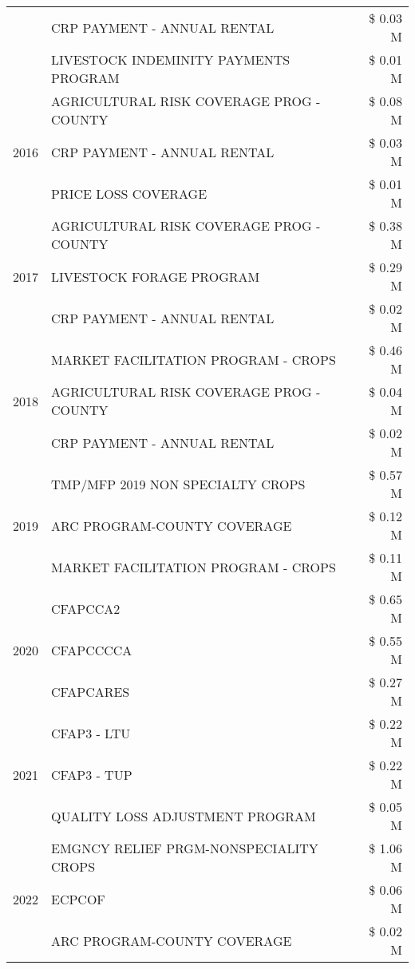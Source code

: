 \begin{tabular}{llr}
 & CRP PAYMENT - ANNUAL RENTAL & \$ 0.03 M \\
 & LIVESTOCK INDEMINITY PAYMENTS PROGRAM & \$ 0.01 M \\
\cline{1-3}
\multirow[t]{3}{*}{2016} & AGRICULTURAL RISK COVERAGE PROG - COUNTY & \$ 0.08 M \\
 & CRP PAYMENT - ANNUAL RENTAL & \$ 0.03 M \\
 & PRICE LOSS COVERAGE & \$ 0.01 M \\
\cline{1-3}
\multirow[t]{3}{*}{2017} & AGRICULTURAL RISK COVERAGE PROG - COUNTY & \$ 0.38 M \\
 & LIVESTOCK FORAGE PROGRAM & \$ 0.29 M \\
 & CRP PAYMENT - ANNUAL RENTAL & \$ 0.02 M \\
\cline{1-3}
\multirow[t]{3}{*}{2018} & MARKET FACILITATION PROGRAM - CROPS & \$ 0.46 M \\
 & AGRICULTURAL RISK COVERAGE PROG - COUNTY & \$ 0.04 M \\
 & CRP PAYMENT - ANNUAL RENTAL & \$ 0.02 M \\
\cline{1-3}
\multirow[t]{3}{*}{2019} & TMP/MFP 2019 NON SPECIALTY CROPS & \$ 0.57 M \\
 & ARC PROGRAM-COUNTY COVERAGE & \$ 0.12 M \\
 & MARKET FACILITATION PROGRAM - CROPS & \$ 0.11 M \\
\cline{1-3}
\multirow[t]{3}{*}{2020} & CFAPCCA2 & \$ 0.65 M \\
 & CFAPCCCCA & \$ 0.55 M \\
 & CFAPCARES & \$ 0.27 M \\
\cline{1-3}
\multirow[t]{3}{*}{2021} & CFAP3 - LTU & \$ 0.22 M \\
 & CFAP3 - TUP & \$ 0.22 M \\
 & QUALITY LOSS ADJUSTMENT PROGRAM & \$ 0.05 M \\
\cline{1-3}
\multirow[t]{3}{*}{2022} & EMGNCY RELIEF PRGM-NONSPECIALITY CROPS & \$ 1.06 M \\
 & ECPCOF & \$ 0.06 M \\
 & ARC PROGRAM-COUNTY COVERAGE & \$ 0.02 M \\
\cline{1-3}
\bottomrule
\end{tabular}
